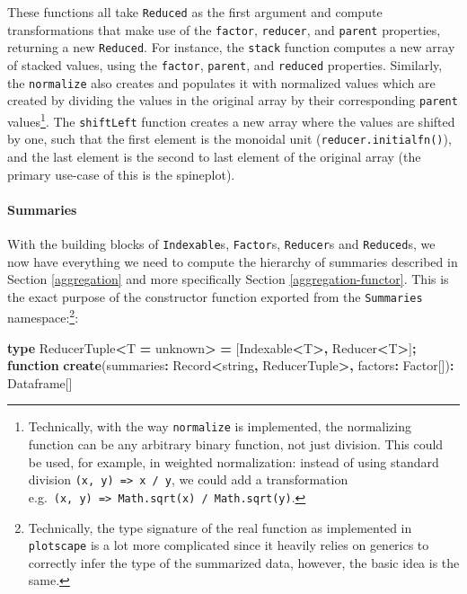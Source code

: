 \documentclass[
  openany]{book}
\newenvironment{Shaded}{\begin{snugshade}}{\end{snugshade}}
\newcommand{\BuiltInTok}[1]{#1}
\newcommand{\DataTypeTok}[1]{\textcolor[rgb]{0.13,0.29,0.53}{#1}}
\newcommand{\FunctionTok}[1]{\textcolor[rgb]{0.13,0.29,0.53}{\textbf{#1}}}
\newcommand{\KeywordTok}[1]{\textcolor[rgb]{0.13,0.29,0.53}{\textbf{#1}}}
\newcommand{\NormalTok}[1]{#1}
\newcommand{\OperatorTok}[1]{\textcolor[rgb]{0.81,0.36,0.00}{\textbf{#1}}}
\theoremstyle{definition}
\theoremstyle{definition}
\theoremstyle{definition}
\theoremstyle{definition}
\theoremstyle{remark}
\begin{document}
These functions all take \texttt{Reduced} as the first argument and compute transformations that make use of the \texttt{factor}, \texttt{reducer}, and \texttt{parent} properties, returning a new \texttt{Reduced}. For instance, the \texttt{stack} function computes a new array of stacked values, using the \texttt{factor}, \texttt{parent}, and \texttt{reduced} properties. Similarly, the \texttt{normalize} also creates and populates it with normalized values which are created by dividing the values in the original array by their corresponding \texttt{parent} values\footnote{Technically, with the way \texttt{normalize} is implemented, the normalizing function can be any arbitrary binary function, not just division. This could be used, for example, in weighted normalization: instead of using standard division \texttt{(x,\ y)\ =\textgreater{}\ x\ /\ y}, we could add a transformation e.g.~\texttt{(x,\ y)\ =\textgreater{}\ Math.sqrt(x)\ /\ Math.sqrt(y)}.}. The \texttt{shiftLeft} function creates a new array where the values are shifted by one, such that the first element is the monoidal unit (\texttt{reducer.initialfn()}), and the last element is the second to last element of the original array (the primary use-case of this is the spineplot).

\paragraph{Summaries}\label{summaries}

With the building blocks of \texttt{Indexable}s, \texttt{Factor}s, \texttt{Reducer}s and \texttt{Reduced}s, we now have everything we need to compute the hierarchy of summaries described in Section \ref{aggregation} and more specifically Section \ref{aggregation-functor}. This is the exact purpose of the constructor function exported from the \texttt{Summaries} namespace:\footnote{Technically, the type signature of the real function as implemented in \texttt{plotscape} is a lot more complicated since it heavily relies on generics to correctly infer the type of the summarized data, however, the basic idea is the same.}:

\begin{Shaded}
\begin{Highlighting}[]
\KeywordTok{type}\NormalTok{ ReducerTuple}\OperatorTok{\textless{}}\NormalTok{T }\OperatorTok{=} \DataTypeTok{unknown}\OperatorTok{\textgreater{}} \OperatorTok{=}\NormalTok{ [Indexable}\OperatorTok{\textless{}}\NormalTok{T}\OperatorTok{\textgreater{},}\NormalTok{ Reducer}\OperatorTok{\textless{}}\NormalTok{T}\OperatorTok{\textgreater{}}\NormalTok{]}\OperatorTok{;}
\KeywordTok{function} \FunctionTok{create}\NormalTok{(summaries}\OperatorTok{:} \BuiltInTok{Record}\OperatorTok{\textless{}}\DataTypeTok{string}\OperatorTok{,}\NormalTok{ ReducerTuple}\OperatorTok{\textgreater{},} 
\NormalTok{                factors}\OperatorTok{:}\NormalTok{ Factor[])}\OperatorTok{:}\NormalTok{ Dataframe[]}
\end{Highlighting}
\end{Shaded}
\end{document}
